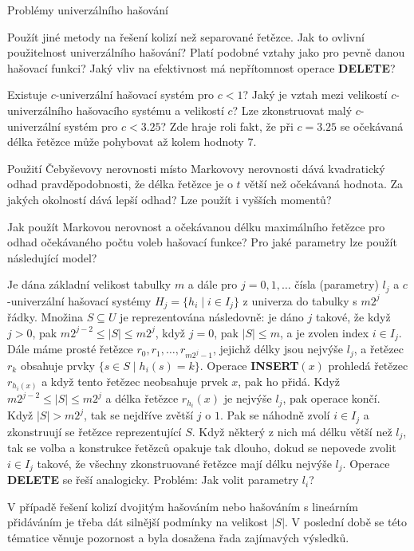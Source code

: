 \documentclass[a4paper,12pt]{article}
\begin{document}
\subhead
Problémy univerzálního hašování
\endsubhead

Použít jiné metody na řešení kolizí než 
separované řetězce. Jak to ovlivní použitelnost 
univerzálního hašování? Platí podobné vztahy jako pro 
pevně danou hašovací funkci? Jaký vliv na efektivnost 
má nepřítomnost operace {\bf DELETE}?

Existuje $c$-univerzální hašovací systém pro 
$c<1$? Jaký je vztah mezi velikostí $c$-univerzální\-ho 
hašovacího systému a velikostí $c$? Lze zkonstruovat 
malý $c$-univerzální systém pro $c<3.25$? Zde hraje roli 
fakt, že při $c=3.25$ se očekávaná délka řetězce 
může pohybovat až kolem hodnoty $7$.

Použití \v Cebyševovy nerovnosti místo 
Markovovy nerovnosti dává kvadratický odhad 
prav\-dě\-podobnosti, že délka řetězce je o $t$ větší než 
očekávaná hodnota. Za jakých okolností dává lepší 
odhad? Lze použít i vyšších momentů?

Jak použít Markovou nerovnost a očekávanou 
délku maximál\-ní\-ho řetězce pro odhad očeká\-va\-ného 
počtu voleb hašovací funk\-ce? 
Pro jaké parametry lze použít následující model?

Je dána základní velikost tabulky $m$ a dále pro $
j=0,1,\dots$ 
čísla (parametry) $l_j$ a $c$-univer\-zál\-ní hašovací systémy 
$H_j=\{h_i\mid i\in I_j\}$ z univerza do tabulky s $m2^j$ řádky.\newline 
Množina $S\subseteq U$ je reprezentována následovně:  je dáno $
j$ 
tako\-vé, že když $j>0$, pak $m2^{j-2}\le |S|\le m2^j$, když $
j=0$, pak 
$|S|\le m$, a je zvolen index $i\in I_j$.  Dále máme prosté řetězce 
$r_0,r_1,\dots,r_{m2^j-1}$, jejichž délky jsou nejvýše $
l_j$, a řetězec $r_k$ 
obsahuje prvky $\{s\in S\mid h_i(s)=k\}$.\newline 
Operace {\bf INSERT$(x)$} prohledá řetězec $r_{h_i(x)}$ a když tento 
ře\-tě\-zec neobsahuje prvek $x$, pak ho přidá.  Když 
$m2^{j-2}\le |S|\le m2^j$ a délka řetězce $r_{h_i}(x)$ je nejvýše $
l_j$, pak 
operace končí.  Když $|S|>m2^j$, tak se nejdříve zvětší $
j$ o $1$.  
Pak se náhodně zvolí $i\in I_j$ a zkonstruují se řetězce 
reprezentující $S$.  Když některý z nich má délku větší než $
l_j$, 
tak se volba a konstrukce řetězců opakuje tak dlouho, 
dokud se nepovede zvolit $i\in I_j$ takové, že všechny 
zkonstruované řetězce mají délku nejvýše $l_j$.  Operace {\bf DELETE }
se řeší analogicky.\newline 
Problém:  Jak volit parametry $l_i$?  

V případě řešení 
kolizí dvojitým hašováním nebo hašováním s 
lineárním přidáváním je třeba dát silnější podmínky na velikost $
|S|$. V poslední době se této tématice 
věnuje pozornost a byla dosažena řada zajímavých výsledků.
\end{document}
